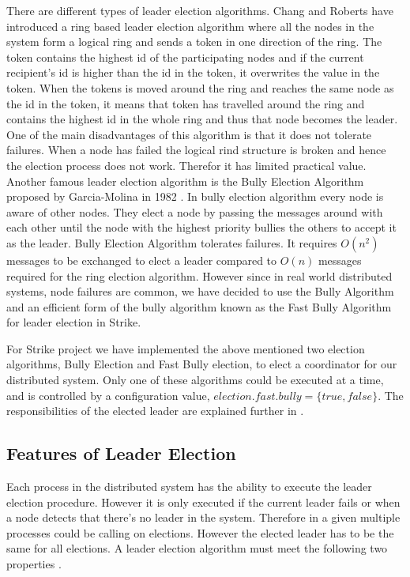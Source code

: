 \documentclass[dareport.tex]{subfiles}
\begin{document}
There are different types of leader election algorithms. Chang and Roberts have introduced a ring based leader election algorithm\cite{ChangRoberts-ringelection} where all the nodes in the system form a logical ring and sends a token in one direction of the ring. The token contains the highest id of the participating nodes and if the current recipient's id is higher than the id in the token, it overwrites the value in the token. When the tokens is moved around the ring and reaches the same node as the id in the token, it means that token has travelled around the ring and contains the highest id in the whole ring and thus that node becomes the leader. One of the main disadvantages of this algorithm is that it does not tolerate failures. When a node has failed the logical rind structure is broken and hence the election process does not work. Therefor it has limited practical value. Another famous leader election algorithm is the Bully Election Algorithm proposed by Garcia-Molina in 1982 \cite{election}. In bully election algorithm every node is aware of other nodes. They elect a node by passing the messages around with each other until the node with the highest priority bullies the others to accept it as the leader. Bully Election Algorithm tolerates failures. It requires $ O(n^2) $ messages to be exchanged to elect a leader compared to $ O(n) $ messages required for the ring election algorithm. However since in real world distributed systems, node failures are common, we have decided to use the Bully Algorithm and an efficient form of the bully algorithm known as the Fast Bully Algorithm\cite{fastbully} for leader election in Strike. 

For Strike project we have implemented the above mentioned two election algorithms, Bully Election and Fast Bully election, to elect a coordinator for our distributed system. Only one of these algorithms could be executed at a time, and is controlled by a configuration value, $election.fast.bully=\{true, false\}$. The responsibilities of the elected leader are explained further in .

\subsection{Features of Leader Election}
Each process in the distributed system has the ability to execute the leader election procedure. However it is only executed if the current leader fails or when a node detects that there's no leader in the system. Therefore in a given multiple processes could be calling on elections. However the elected leader has to be the same for all elections. A leader election algorithm must meet the following two properties \cite{coulouris}.
\end{document}
